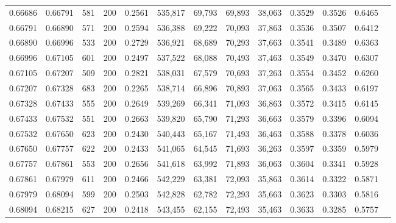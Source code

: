 \begin{tabular}{rrrrrrrrrrrrr}
0.66686 & 0.66791 &   581 & 200 &                                     0.2561 & 535,817 &  69,793 &  69,893 &  38,063 & 0.3529 & 0.3526 & 0.6465 \\
0.66791 & 0.66890 &   571 & 200 &                                     0.2594 & 536,388 &  69,222 &  70,093 &  37,863 & 0.3536 & 0.3507 & 0.6412 \\
0.66890 & 0.66996 &   533 & 200 &                                     0.2729 & 536,921 &  68,689 &  70,293 &  37,663 & 0.3541 & 0.3489 & 0.6363 \\
0.66996 & 0.67105 &   601 & 200 &                                     0.2497 & 537,522 &  68,088 &  70,493 &  37,463 & 0.3549 & 0.3470 & 0.6307 \\
0.67105 & 0.67207 &   509 & 200 &                                     0.2821 & 538,031 &  67,579 &  70,693 &  37,263 & 0.3554 & 0.3452 & 0.6260 \\
0.67207 & 0.67328 &   683 & 200 &                                     0.2265 & 538,714 &  66,896 &  70,893 &  37,063 & 0.3565 & 0.3433 & 0.6197 \\
0.67328 & 0.67433 &   555 & 200 &                                     0.2649 & 539,269 &  66,341 &  71,093 &  36,863 & 0.3572 & 0.3415 & 0.6145 \\
0.67433 & 0.67532 &   551 & 200 &                                     0.2663 & 539,820 &  65,790 &  71,293 &  36,663 & 0.3579 & 0.3396 & 0.6094 \\
0.67532 & 0.67650 &   623 & 200 &                                     0.2430 & 540,443 &  65,167 &  71,493 &  36,463 & 0.3588 & 0.3378 & 0.6036 \\
0.67650 & 0.67757 &   622 & 200 &                                     0.2433 & 541,065 &  64,545 &  71,693 &  36,263 & 0.3597 & 0.3359 & 0.5979 \\
0.67757 & 0.67861 &   553 & 200 &                                     0.2656 & 541,618 &  63,992 &  71,893 &  36,063 & 0.3604 & 0.3341 & 0.5928 \\
0.67861 & 0.67979 &   611 & 200 &                                     0.2466 & 542,229 &  63,381 &  72,093 &  35,863 & 0.3614 & 0.3322 & 0.5871 \\
0.67979 & 0.68094 &   599 & 200 &                                     0.2503 & 542,828 &  62,782 &  72,293 &  35,663 & 0.3623 & 0.3303 & 0.5816 \\
0.68094 & 0.68215 &   627 & 200 &                                     0.2418 & 543,455 &  62,155 &  72,493 &  35,463 & 0.3633 & 0.3285 & 0.5757 \\

\end{tabular}
